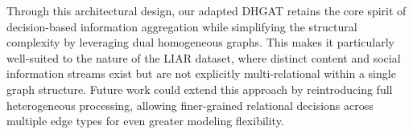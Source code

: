 Through this architectural design, our adapted DHGAT retains the core spirit of decision-based information aggregation while simplifying the structural complexity by leveraging dual homogeneous graphs. This makes it particularly well-suited to the nature of the LIAR dataset, where distinct content and social information streams exist but are not explicitly multi-relational within a single graph structure. Future work could extend this approach by reintroducing full heterogeneous processing, allowing finer-grained relational decisions across multiple edge types for even greater modeling flexibility.
